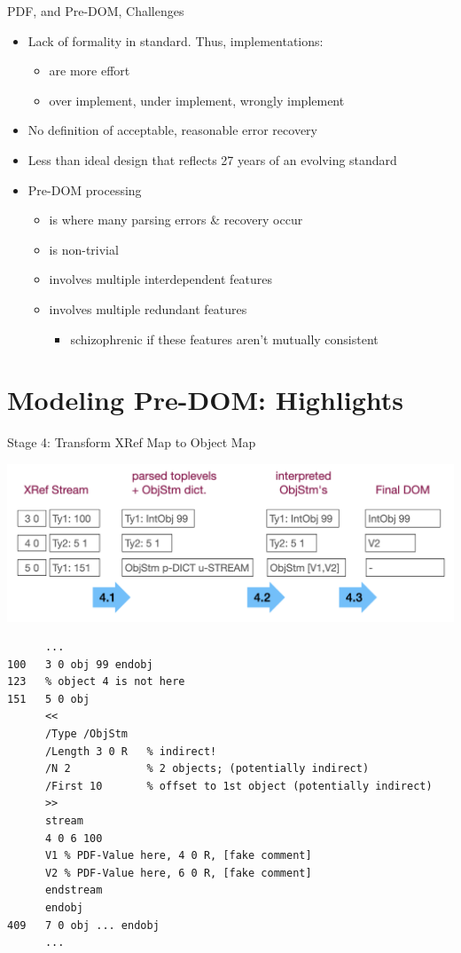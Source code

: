 \documentclass[t,10pt,xcolor={dvipsnames}]{beamer}
\begin{document}
\begin{frame}[label={sec:orgaae2d4e}]{PDF, and Pre-DOM, Challenges}
\begin{itemize}
\item Lack of formality in standard. Thus, implementations:
\begin{itemize}
\item are more effort
\item over implement, under implement, wrongly implement
\end{itemize}
\item No definition of acceptable, reasonable error recovery
\item Less than ideal design that reflects 27 years of an evolving standard
\item Pre-DOM processing
\begin{itemize}
\item is where many parsing errors \& recovery occur
\item is non-trivial
\item involves multiple interdependent features
\item involves multiple redundant features
\begin{itemize}
\item schizophrenic if these features aren't mutually consistent
\end{itemize}
\end{itemize}
\end{itemize}
\end{frame}

\section{Modeling Pre-DOM: Highlights}
\label{sec:org99f1197}
\begin{frame}[label={sec:org173bc68},fragile]{Stage 4: Transform XRef Map to Object Map}
 \begin{center}
\includegraphics[width=0.8\linewidth]{images/diagram1/cropped-diagram1.001.png}
\end{center}
\begin{verbatim}
      ...
100   3 0 obj 99 endobj
123   % object 4 is not here
151   5 0 obj
      <<
      /Type /ObjStm
      /Length 3 0 R   % indirect!
      /N 2            % 2 objects; (potentially indirect)
      /First 10       % offset to 1st object (potentially indirect)
      >>
      stream
      4 0 6 100
      V1 % PDF-Value here, 4 0 R, [fake comment] 
      V2 % PDF-Value here, 6 0 R, [fake comment]
      endstream
      endobj
409   7 0 obj ... endobj
      ...
\end{verbatim}
\end{frame}
\end{document}
